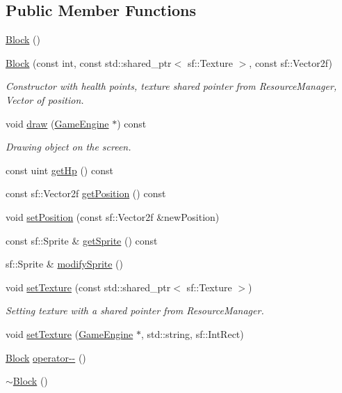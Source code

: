 \subsection*{Public Member Functions}
\begin{DoxyCompactItemize}
\item 
\mbox{\hyperlink{class_block_a37658a946bf5067ad01d68d9ff086adc}{Block}} ()
\item 
\mbox{\hyperlink{class_block_a6e2109c914d77166f2879944da582e7a}{Block}} (const int, const std\+::shared\+\_\+ptr$<$ sf\+::\+Texture $>$, const sf\+::\+Vector2f)
\begin{DoxyCompactList}\small\item\em Constructor with health points, texture shared pointer from Resource\+Manager, Vector of position. \end{DoxyCompactList}\item 
void \mbox{\hyperlink{class_block_a3a41cfe615a31b5c4b824004d248ba65}{draw}} (\mbox{\hyperlink{class_game_engine}{Game\+Engine}} $\ast$) const
\begin{DoxyCompactList}\small\item\em Drawing object on the screen. \end{DoxyCompactList}\item 
const uint \mbox{\hyperlink{class_block_a01788216d95ab7230287cb0d58a19c34}{get\+Hp}} () const
\item 
const sf\+::\+Vector2f \mbox{\hyperlink{class_block_ae7621aaed284804fc898174207eb1587}{get\+Position}} () const
\item 
void \mbox{\hyperlink{class_block_a9c4782f321b4760d572a01bd31c42a06}{set\+Position}} (const sf\+::\+Vector2f \&new\+Position)
\item 
const sf\+::\+Sprite \& \mbox{\hyperlink{class_block_a40e27a756a586c9784d4023163bf92ef}{get\+Sprite}} () const
\item 
sf\+::\+Sprite \& \mbox{\hyperlink{class_block_affece2c491813eba0583a9deeee9d925}{modify\+Sprite}} ()
\item 
void \mbox{\hyperlink{class_block_a01ef735022e9a92357e00cca6228f7b7}{set\+Texture}} (const std\+::shared\+\_\+ptr$<$ sf\+::\+Texture $>$)
\begin{DoxyCompactList}\small\item\em Setting texture with a shared pointer from Resource\+Manager. \end{DoxyCompactList}\item 
void \mbox{\hyperlink{class_block_a866e57c9df2c81910879ef991670931e}{set\+Texture}} (\mbox{\hyperlink{class_game_engine}{Game\+Engine}} $\ast$, std\+::string, sf\+::\+Int\+Rect)
\item 
\mbox{\hyperlink{class_block}{Block}} \mbox{\hyperlink{class_block_a50da8f492c009ad7f4e9e30d904603ef}{operator-\/-\/}} ()
\item 
\mbox{\hyperlink{class_block_a19d1bd0e1cef6a865ed2745a2e648405}{$\sim$\+Block}} ()
\end{DoxyCompactItemize}
